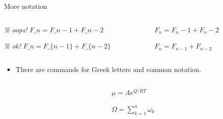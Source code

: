 \documentclass[,aspectratio=43]{beamer}
\newenvironment{Shaded}{\begin{snugshade}}{\end{snugshade}}
\newcommand{\CommentTok}[1]{\textcolor[rgb]{0.38,0.63,0.69}{\textit{#1}}}
\newcommand{\SpecialCharTok}[1]{\textcolor[rgb]{0.25,0.44,0.63}{#1}}
\newcommand{\SpecialStringTok}[1]{\textcolor[rgb]{0.73,0.40,0.53}{#1}}
\providecommand{\tightlist}{%
  \setlength{\itemsep}{0pt}\setlength{\parskip}{0pt}}
\begin{document}
\begin{frame}[fragile]{More notation}
\begin{columns}[T]
\begin{column}{0.58\textwidth}
\begin{Shaded}
\begin{Highlighting}[]
\CommentTok{\% oops!}
\SpecialStringTok{$F\_n = F\_n{-}1 + F\_n{-}2$}

\CommentTok{\% ok!}
\SpecialStringTok{$F\_n = F\_\{n{-}1\} + F\_\{n{-}2\}$}
\end{Highlighting}
\end{Shaded}
\end{column}

\begin{column}{0.38\textwidth}
\vspace{1em}

\(F_n = F_n-1 + F_n-2\)

\vspace{2em}

\(F_n = F_{n-1} + F_{n-2}\)
\end{column}
\end{columns}

\vspace{0.5em}

\begin{itemize}
\tightlist
\item
  There are commands for Greek letters and common notation.
\end{itemize}

\begin{columns}[T]
\begin{column}{0.58\textwidth}
\small
\vspace{-1em}

\begin{Shaded}
\end{Shaded}
\end{column}

\begin{column}{0.38\textwidth}
\(\mu = A e^{Q/RT}\)

\vspace{1em}

\(\Omega = \sum_{k=1}^{n} \omega_k\)
\end{column}
\end{columns}
\end{frame}
\end{document}

